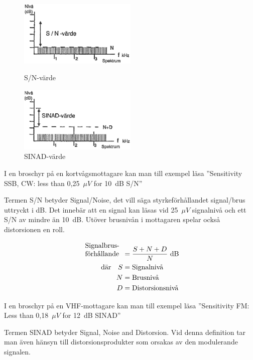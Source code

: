 \begin{figure}
  \includegraphics[width=0.5\textwidth]{images/cropped_pdfs/bild_2_4-29.pdf}
  \caption{S/N-värde}
  \label{fig:bildII4-29}

  \includegraphics[width=0.5\textwidth]{images/cropped_pdfs/bild_2_4-30.pdf}
  \caption{SINAD-värde}
  \label{fig:bildII4-30}
\end{figure}

I en broschyr på en kortvågsmottagare kan man till exempel läsa
''Sensitivity SSB, CW: less than 0,25~\(\mu V\) for 10~dB S/N''

Termen S/N betyder Signal/Noise, det vill säga styrkeförhållandet signal/brus
uttryckt i dB.
Det innebär att en signal kan läsas vid 25~\(\mu V\) signalnivå och ett S/N av
mindre än 10~dB.
Utöver brusnivån i mottagaren spelar också distorsionen en roll.

\begin{align*}
  \begin{array}[b]{l}
    \text{Signalbrus-} \\
    \text{förhållande}
  \end{array} &= \frac{S + N + D}{N} \text{ dB} \\
  \text{där} \quad S &= \text{Signalnivå} \\
  N &= \text{Brusnivå} \\
  D &= \text{Distorsionsnivå} \\
\end{align*}

I en broschyr på en VHF-mottagare kan man till exempel läsa
''Sensitivity FM: Less than 0,18~\(\mu V\) for 12~dB SINAD''

Termen SINAD betyder Signal, Noise and Distorsion.
Vid denna definition tar man även hänsyn till distorsionsprodukter som orsakas
av den modulerande signalen.

